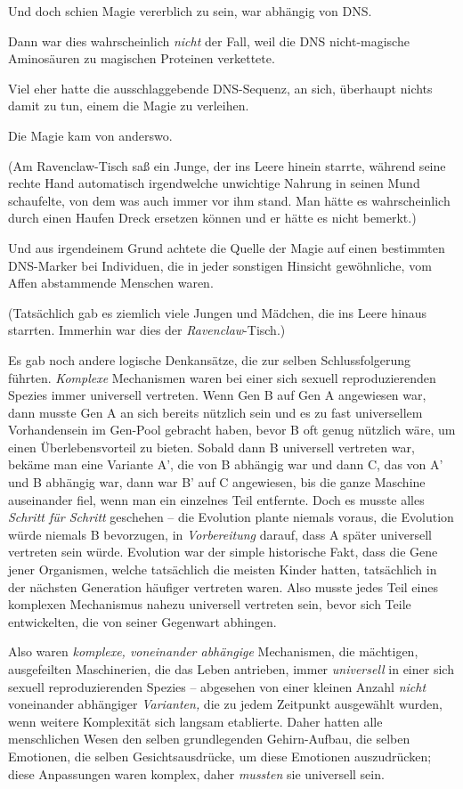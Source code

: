 {Und doch schien Magie vererblich zu sein, war abhängig von DNS.

Dann war dies wahrscheinlich \emph{nicht} der Fall, weil die DNS nicht-magische Aminosäuren zu magischen Proteinen verkettete.

Viel eher hatte die ausschlaggebende DNS-Sequenz, an sich, überhaupt nichts damit zu tun, einem die Magie zu verleihen.

Die Magie kam von anderswo.

(Am Ravenclaw-Tisch saß ein Junge, der ins Leere hinein starrte, während seine rechte Hand automatisch irgendwelche unwichtige Nahrung in seinen Mund schaufelte, von dem was auch immer vor ihm stand. Man hätte es wahrscheinlich durch einen Haufen Dreck ersetzen können und er hätte es nicht bemerkt.)

Und aus irgendeinem Grund achtete die Quelle der Magie auf einen bestimmten DNS-Marker bei Individuen, die in jeder sonstigen Hinsicht gewöhnliche, vom Affen abstammende Menschen waren.

(Tatsächlich gab es ziemlich viele Jungen und Mädchen, die ins Leere hinaus starrten. Immerhin war dies der \emph{Ravenclaw}-Tisch.)

Es gab noch andere logische Denkansätze, die zur selben Schlussfolgerung führten. \emph{Komplexe} Mechanismen waren bei einer sich sexuell reproduzierenden Spezies immer universell vertreten. Wenn Gen B auf Gen A angewiesen war, dann musste Gen A an sich bereits nützlich sein und es zu fast universellem Vorhandensein im Gen-Pool gebracht haben, bevor B oft genug nützlich wäre, um einen Überlebensvorteil zu bieten. Sobald dann B universell vertreten war, bekäme man eine Variante A', die von B abhängig war und dann C, das von A' und B abhängig war, dann war B' auf C angewiesen, bis die ganze Maschine auseinander fiel, wenn man ein einzelnes Teil entfernte. Doch es musste alles \emph{Schritt für Schritt} geschehen -- die Evolution plante niemals voraus, die Evolution würde niemals B bevorzugen, in \emph{Vorbereitung} darauf, dass A später universell vertreten sein würde. Evolution war der simple historische Fakt, dass die Gene jener Organismen, welche tatsächlich die meisten Kinder hatten, tatsächlich in der nächsten Generation häufiger vertreten waren. Also musste jedes Teil eines komplexen Mechanismus nahezu universell vertreten sein, bevor sich Teile entwickelten, die von seiner Gegenwart abhingen.

Also waren \emph{komplexe, voneinander abhängige} Mechanismen, die mächtigen, ausgefeilten Maschinerien, die das Leben antrieben, immer \emph{universell} in einer sich sexuell reproduzierenden Spezies -- abgesehen von einer kleinen Anzahl \emph{nicht} voneinander abhängiger \emph{Varianten,} die zu jedem Zeitpunkt ausgewählt wurden, wenn weitere Komplexität sich langsam etablierte. Daher hatten alle menschlichen Wesen den selben grundlegenden Gehirn-Aufbau, die selben Emotionen, die selben Gesichtsausdrücke, um diese Emotionen auszudrücken; diese Anpassungen waren komplex, daher \emph{mussten} sie universell sein.

}
